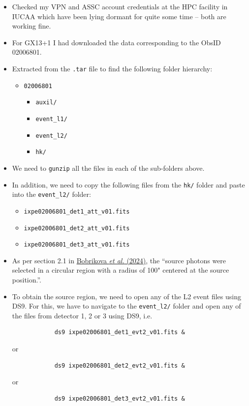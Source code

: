 	\begin{itemize}
		\item Checked my VPN and ASSC account credentials at the HPC facility in IUCAA which have been lying dormant for quite some time -- both are working fine.
		
		\item For GX13+1 I had downloaded the data corresponding to the ObsID 02006801.
		
		\item Extracted from the \verb|.tar| file to find the following folder hierarchy:
		\begin{itemize}
			\item \verb|02006801|
			\begin{itemize}
				\item \verb|auxil/|
				\item \verb|event_l1/|
				\item \verb|event_l2/|
				\item \verb|hk/|
			\end{itemize}
		\end{itemize}
		
		\item We need to \verb|gunzip| all the files in each of the sub-folders above.
		
		\item In addition, we need to copy the following files from the \verb|hk/| folder and paste into the \verb|event_l2/| folder:
		\begin{itemize}
			\item \verb|ixpe02006801_det1_att_v01.fits|
			\item \verb|ixpe02006801_det2_att_v01.fits|
			\item \verb|ixpe02006801_det3_att_v01.fits|
		\end{itemize}
		
		\item As per section 2.1 in \href{https://www.aanda.org/articles/aa/pdf/2024/08/aa50207-24.pdf}{Bobrikova \textit{et al.} (2024)}, the ``source photons were selected in a circular region with a radius of 100" centered at the source position.''.
		
		\item To obtain the source region, we need to open any of the L2 event files using DS9. For this, we have to navigate to the \verb|event_l2/| folder and open any of the files from detector 1, 2 or 3 using DS9, i.e.
		\begin{verbatim}
			ds9 ixpe02006801_det1_evt2_v01.fits &
		\end{verbatim}
		\begin{center}
			or
		\end{center}
		\begin{verbatim}
			ds9 ixpe02006801_det2_evt2_v01.fits &
		\end{verbatim}
		\begin{center}
			or
		\end{center}
		\begin{verbatim}
			ds9 ixpe02006801_det3_evt2_v01.fits &
		\end{verbatim}
		

\end{itemize}
